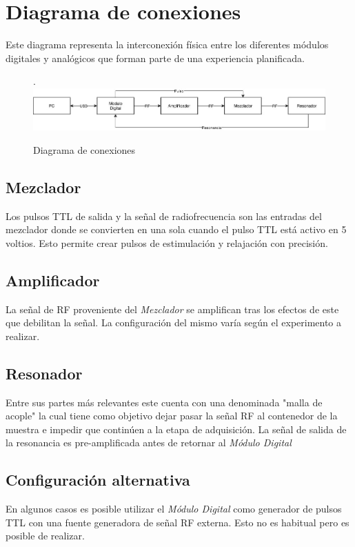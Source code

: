 \section{Diagrama de conexiones}

Este diagrama representa la interconexi\'on f\'isica entre los diferentes m\'odulos digitales y anal\'ogicos que forman
parte de una experiencia planificada.

\begin{figure}[!htb].
    \includegraphics[width=\linewidth]{../figures/d4.jpg}
    \caption{Diagrama de conexiones}
    \label{fig:d4}
\end{figure}
  

\subsection{Mezclador}

Los pulsos TTL de salida y la se\~nal de radiofrecuencia son las entradas del mezclador
donde se convierten en una sola cuando el pulso TTL est\'a activo en 5 voltios.
Esto permite crear pulsos de estimulaci\'on y relajaci\'on con precisi\'on.

\subsection{Amplificador}
La se\~nal de RF proveniente del \textit{Mezclador} se amplifican tras los efectos de este que debilitan la se\~nal.
La configuraci\'on del mismo var\'ia seg\'un el experimento a realizar.

\subsection{Resonador}
Entre sus partes m\'as relevantes este cuenta con una denominada "malla de acople" la cual
tiene como objetivo dejar pasar la se\~nal RF al contenedor de la muestra e impedir
que contin\'uen a la etapa de adquisici\'on.
La se\~nal de salida de la resonancia es pre-amplificada antes de retornar al \textit{M\'odulo Digital}

\subsection{Configuraci\'on alternativa}
En algunos casos es posible utilizar el \textit{M\'odulo Digital} como generador de pulsos TTL con una fuente
generadora de se\~nal RF externa. Esto no es habitual pero es posible de realizar.

\newpage
